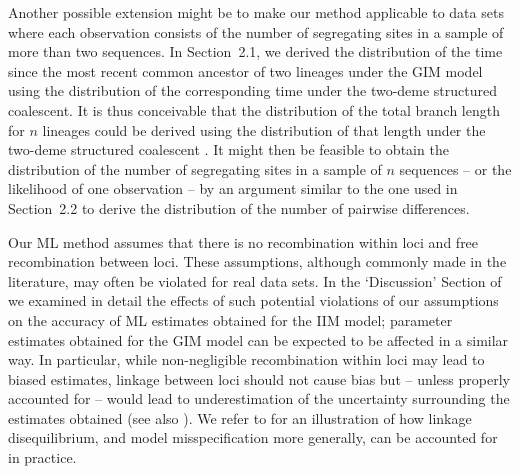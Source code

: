 \documentclass[11pt]{article}
\begin{document}
{\color{red}
Another possible extension might be to make our method applicable to data sets 
where each observation consists of the number of segregating sites in a sample of more than two sequences. In Section~2.1, we derived the distribution of the time since the most recent common ancestor of two lineages under the GIM model using the distribution of the corresponding time under the two-deme structured coalescent. It is thus conceivable that the distribution of the total branch length for $n$ lineages could be derived using the distribution of that length under the two-deme structured coalescent  \citep[as given by][]{Kumagai2015}.
 It might then be feasible to obtain the distribution of the number of segregating sites in a sample of $n$ sequences -- or the likelihood of one observation -- by an argument similar to the one used  in Section~2.2 to derive the distribution of the number of pairwise differences.
}


Our ML method 
assumes that there is no recombination within loci and free recombination between loci. These assumptions, although commonly made in the literature, may often be violated for real data sets. In the `Discussion' Section of \citet{Costa2017} we examined in detail
the effects of such potential violations of our assumptions on the accuracy of ML estimates obtained for the IIM model; parameter estimates obtained for the GIM model can be expected to be affected in a similar way. In particular, while 
non-negligible recombination within loci may lead to biased estimates,
linkage between loci should not cause bias but -- unless properly accounted for -- would lead to underestimation of the uncertainty surrounding the estimates obtained (see also \citealp{Baird2015, Lohse2016}).
We refer
 to \citet{Costa2017} for an illustration of how linkage disequilibrium, and model misspecification more generally, can be accounted for in practice.
\end{document}
